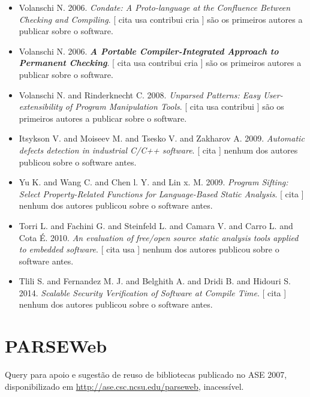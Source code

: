 \begin{itemize}
\item Volanschi N.
      2006.
        \textit{ Condate: A Proto-language at the Confluence Between Checking and Compiling}.
      [
          cita
          usa
          contribui
          cria
      ]
são os primeiros autores a publicar sobre o software.
\item Volanschi N.
      2006.
        \textbf{\textit{ A Portable Compiler-Integrated Approach to Permanent Checking}}.
      [
          cita
          usa
          contribui
          cria
      ]
são os primeiros autores a publicar sobre o software.
\item Volanschi N. and Rinderknecht C.
      2008.
        \textit{ Unparsed Patterns: Easy User-extensibility of Program Manipulation Tools}.
      [
          cita
          usa
          contribui
      ]
são os primeiros autores a publicar sobre o software.
\item Itsykson V. and Moiseev M. and Tsesko V. and Zakharov A.
      2009.
        \textit{ Automatic defects detection in industrial C/C++ software}.
      [
          cita
      ]
nenhum dos autores publicou sobre o software antes.
\item Yu K. and Wang C. and Chen l. Y. and Lin x. M.
      2009.
        \textit{ Program Sifting: Select Property-Related Functions for Language-Based Static Analysis}.
      [
          cita
      ]
nenhum dos autores publicou sobre o software antes.
\item Torri L. and Fachini G. and Steinfeld L. and Camara V. and Carro L. and Cota É.
      2010.
        \textit{ An evaluation of free/open source static analysis tools applied to embedded software}.
      [
          cita
          usa
      ]
nenhum dos autores publicou sobre o software antes.
\item Tlili S. and Fernandez M. J. and Belghith A. and Dridi B. and Hidouri S.
      2014.
        \textit{ Scalable Security Verification of Software at Compile Time}.
      [
          cita
      ]
nenhum dos autores publicou sobre o software antes.
\end{itemize}
\section{PARSEWeb}

Query para apoio e sugestão de reuso de bibliotecas
publicado no ASE 2007,
disponibilizado em \url{http://ase.csc.ncsu.edu/parseweb},
inacessível.

